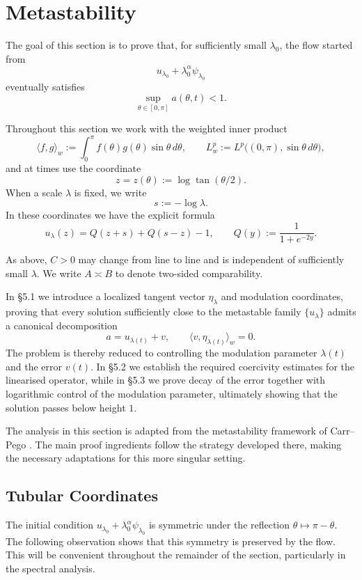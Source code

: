 \documentclass[11pt,a4paper]{article}
\numberwithin{equation}{section}
\theoremstyle{plain}
\theoremstyle{remark}
\begin{document}
\section{Metastability}

The goal of this section is to prove that, for sufficiently small $\lambda_0$, the flow started from
$$
u_{\lambda_0}+\lambda_0^\alpha\psi_{\lambda_0}
$$
eventually satisfies
$$
\sup_{\theta\in[0,\pi]}a(\theta,t)<1.
$$

Throughout this section we work with the weighted inner product
$$
\langle f,g\rangle_w
:=
\int_0^\pi f(\theta)g(\theta)\sin\theta\,d\theta,
\qquad
L_w^p
:=
L^p\bigl((0,\pi),\sin\theta\,d\theta\bigr),
$$
and at times use the coordinate
$$
z=z(\theta):=\log\tan(\theta/2).
$$
When a scale $\lambda$ is fixed, we write
$$
s:=-\log\lambda.
$$
In these coordinates we have the explicit formula
\begin{equation}\label{cylindricformula}
u_\lambda(z)
=
Q(z+s)+Q(s-z)-1,
\qquad
Q(y):=\frac{1}{1+e^{-2y}}.
\end{equation}

As above, $C>0$ may change from line to line and is independent of sufficiently small $\lambda$. We write $A\asymp B$ to denote two-sided comparability.

In \S5.1 we introduce a localized tangent vector $\eta_\lambda$ and modulation coordinates, proving that every solution sufficiently close to the metastable family $\{u_\lambda\}$ admits a canonical decomposition
$$
a=u_{\lambda(t)}+v,
\qquad
\langle v,\eta_{\lambda(t)}\rangle_w=0.
$$
The problem is thereby reduced to controlling the modulation parameter $\lambda(t)$ and the error $v(t)$. In \S5.2 we establish the required coercivity estimates for the linearised operator, while in \S5.3 we prove decay of the error together with logarithmic control of the modulation parameter, ultimately showing that the solution passes below height $1$.

The analysis in this section is adapted from the metastability framework
of Carr--Pego \cite{carr1989metastable}.  The main proof ingredients follow
the strategy developed there, making the necessary adaptations for this more singular setting.  



\subsection{Tubular Coordinates}

The initial condition $u_{\lambda_0}+\lambda_0^\alpha\psi_{\lambda_0}$ is symmetric under the reflection $\theta\mapsto\pi-\theta$. The following observation shows that this symmetry is preserved by the flow. This will be convenient throughout the remainder of the section, particularly in the spectral analysis.
\end{document}
